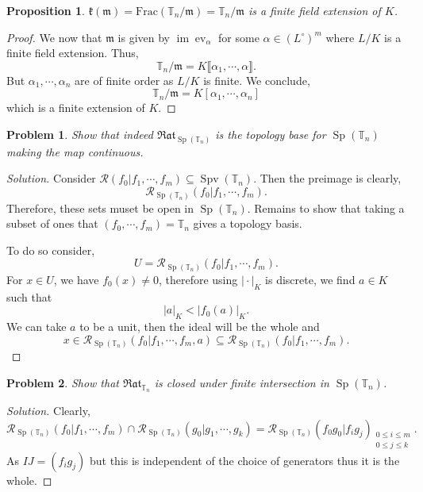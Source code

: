 \documentclass[8pt]{article}
\numberwithin{equation}{section}
\newenvironment{solution}{\begin{proof}[Solution]}{\end{proof}}
\newtheorem{proposition}{Proposition}[section]
\newtheorem{problem}{Problem}[section]
\DeclareMathOperator{\ev}{ev}
\DeclareMathOperator{\Sp}{Sp}
\DeclareMathOperator{\image}{im}
\DeclareMathOperator{\Spv}{Spv}
\newcommand{\m}[0]{\mathfrak{m}}
\newcommand{\T}[0]{\mathbb{T}}
\newcommand{\cR}[0]{\mathcal{R}}
\newcommand{\ab}[1]{\vert #1 \vert}
\newcommand{\Rat}[0]{\mathfrak{Rat}}
\begin{document}
\begin{proposition}
  $\mathfrak{k}(\m)= \mathrm{Frac}(\T_n/\m)=\T_n/\m$ is a finite field extension of $K$. 
\end{proposition}
\begin{proof}
  We now that $\m$ is given by $\image\ev_\alpha$ for some $\alpha\in (L^\circ)^m$ where $L/K$ is a finite field extension. Thus,
  \begin{equation*}
    \T_n/\m = K\llbracket \alpha_1,\cdots,\alpha\rrbracket.
  \end{equation*}
  But $\alpha_1,\cdots,\alpha_n$ are of finite order as $L/K$ is finite. We conclude,
  \begin{equation*}
    \T_n/\m = K[\alpha_1,\cdots,\alpha_n]
  \end{equation*}
  which is a finite extension of $K$.
\end{proof}
\begin{problem}
  Show that indeed $\Rat_{\Sp(\T_n)}$ is the topology base for $\Sp(\T_n)$ making the map continuous.
\end{problem}
\begin{solution}
  Consider $\cR(f_0|f_1,\cdots,f_m)\subseteq \Spv(\T_n)$. Then the preimage is clearly,
  \begin{equation*}
    \cR_{\Sp(\T_n)}(f_0|f_1,\cdots,f_m).
  \end{equation*}
  Therefore, these sets muset be open in $\Sp(\T_n)$. Remains to show that taking a subset of ones that $(f_0,\cdots,f_m)=\T_n$ gives a topology basis.
  \par To do so consider,
  \begin{equation*}
    U = \cR_{\Sp(\T_n)}(f_0|f_1,\cdots,f_m).
  \end{equation*}
  For $x\in U$, we have $f_0(x)\not=0$, therefore using $\ab{\cdot}_K$ is discrete, we find $a\in K$ such that 
  \begin{equation*}
    \ab{a}_K<\ab{f_0(a)}_K.
  \end{equation*}
  We can take $a$ to be a unit, then the ideal will be the whole and 
  \begin{equation*}
    x\in\cR_{\Sp(\T_n)}(f_0|f_1,\cdots,f_m,a)\subseteq \cR_{\Sp(\T_n)}(f_0|f_1,\cdots,f_m).
  \end{equation*}
\end{solution}
\begin{problem}
  Show that $\Rat_{\T_n}$ is closed under finite intersection in $\Sp(\T_n)$.
\end{problem}
\begin{solution}
  Clearly,
  \begin{equation*}
    \cR_{\Sp(\T_n)}(f_0|f_1,\cdots,f_m)\cap \cR_{\Sp(\T_n)}(g_0|g_1,\cdots,g_k)=\cR_{\Sp(\T_n)}(f_0g_0|f_ig_j)_{\substack{0\leq i\leq m\\ 0\leq j\leq k}}.
  \end{equation*}
  As $IJ = (f_ig_j)$ but this is independent of the choice of generators thus it is the whole.
\end{solution}
\end{document}
